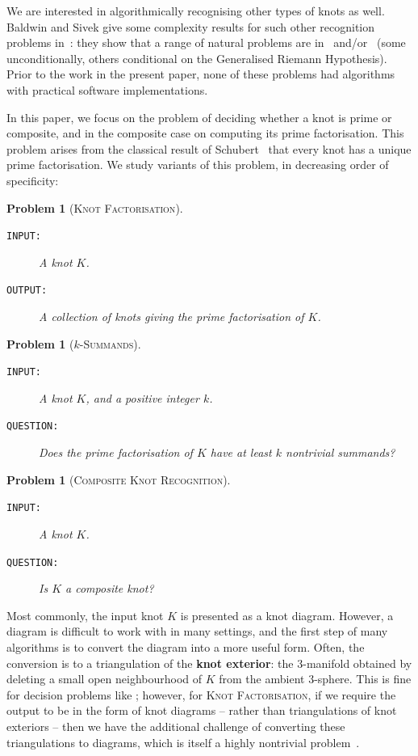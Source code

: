 \documentclass[10pt,a4paper]{amsart}
\newtheorem{problem}[theorem]{Problem}
\begin{document}
We are interested in algorithmically recognising other types of knots as well. Baldwin and Sivek give some complexity results for such other recognition problems in~\cite{baldwin2019complexity}:
they show that a range of natural problems are in \NP\ and/or \coNP\ (some unconditionally, others conditional on the Generalised Riemann Hypothesis).
Prior to the work in the present paper, none of these problems had algorithms with practical software implementations.

In this paper, we focus on the problem of deciding whether a knot is prime or composite, and in the composite case on computing its prime factorisation.
This problem arises from the classical result of Schubert~\cite{schubert49unique} that every knot has a unique prime factorisation. We study variants of this problem, in decreasing order of specificity:

\begin{problem}[\textsc{Knot Factorisation}]\label{problem:factorisation}
\hfill
\begin{description}
\item[\textup{\texttt{INPUT:}}]
A knot $K$.
\item[\textup{\texttt{OUTPUT:}}]
A collection of knots giving the prime factorisation of $K$.
\end{description}
\end{problem}

\begin{problem}[$k$-\textsc{Summands}]\label{problem:summands}
\hfill
\begin{description}
\item[\textup{\texttt{INPUT:}}]
A knot $K$, and a positive integer $k$.
\item[\textup{\texttt{QUESTION:}}]
Does the prime factorisation of $K$ have at least $k$ nontrivial summands?
\end{description}
\end{problem}

\begin{problem}[\textsc{Composite Knot Recognition}]\label{problem:composite}
\hfill
\begin{description}
\item[\textup{\texttt{INPUT:}}]
A knot $K$.
\item[\textup{\texttt{QUESTION:}}]
Is $K$ a composite knot?
\end{description}
\end{problem}

Most commonly, the input knot $K$ is presented as a knot diagram.
However, a diagram is difficult to work with in many settings, and the first step of many algorithms is to convert the diagram into a more useful form.
Often, the conversion is to a triangulation of the \textbf{knot exterior}:
the $3$-manifold obtained by deleting a small open neighbourhood of $K$ from the ambient $3$-sphere.
This is fine for decision problems like ;
however, for \textsc{Knot Factorisation}, if we require the output to be in the form of knot diagrams -- rather than triangulations of knot exteriors -- then we have
the additional challenge of converting these triangulations to diagrams, which is itself a highly nontrivial problem~\cite{dunfield2022diagram}.
\end{document}
